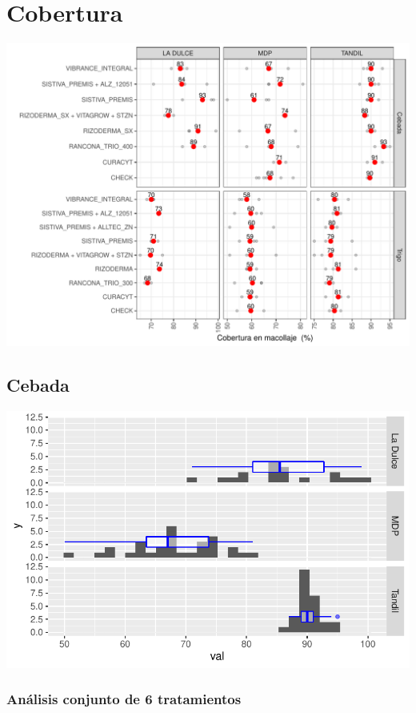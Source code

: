 \documentclass[
  letterpaper,
  DIV=11,
  numbers=noendperiod]{scrartcl}
\begin{document}
\hypertarget{cobertura}{%
\section{Cobertura}\label{cobertura}}

\includegraphics{curasem_files/figure-pdf/cober_plot-1.pdf}

\hypertarget{cebada}{%
\subsection{Cebada}\label{cebada}}

\includegraphics{curasem_files/figure-pdf/unnamed-chunk-7-1.pdf}

\hypertarget{anuxe1lisis-conjunto-de-6-tratamientos}{%
\subsubsection{Análisis conjunto de 6
tratamientos}\label{anuxe1lisis-conjunto-de-6-tratamientos}}
\end{document}
